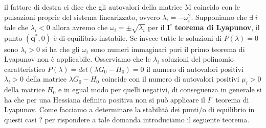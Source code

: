 il fattore di destra ci dice che gli autovalori della matrice M coincido con le pulsazioni proprie del sistema linearizzato, ovvero $\lambda_i = - \omega_i^2$.
Supponiamo che $\exists \; i$ tale che  $\lambda_i <0$ allora avremo che $\omega_i = \pm \sqrt{\lambda_i}$ per il $\bm{I^{\circ}}$ \textbf{teorema di Lyapunov}, il punto $(\bm{q}^{*},0)$ \`{e} di equilibrio instabile. Se invece tutte le soluzioni di $P(\lambda) = 0$ sono $\lambda_i > 0 $ si ha che gli $\omega_i$ sono numeri immaginari puri il primo teorema di Lyapunov non \`{e} applicabile. Osserviamo che le  $\lambda_i$ soluzioni del polinomio caratteristico $P(\lambda) = det (\lambda G_0 -H_0) =0$ il numero di autovalori positivi $\lambda_i > 0 $ della matrice $\lambda G_0 -H_0$ coincide con il numero di autovalori positivi $\mu_i >0$ della matrice $H_0$ e in egual modo per quelli negativi, di conseguenza in generale si ha che per una Hessiana definita positiva non si pu\`{o} applicare il $I^{\circ}$ teorema di Lyapunov.\newline
Come facciamo a determinare la stabilit\`{a} dei punti/o di equilibrio in questi casi ? per rispondere a tale domanda introduciamo il seguente teorema.

